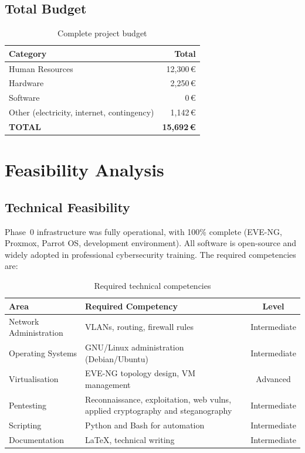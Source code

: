 \subsection{Total Budget}

\begin{table}[H]
    \centering
    \begin{tabularx}{\textwidth}{Xr}
\toprule
    \textbf{Category} & \textbf{Total} \\
\midrule
    Human Resources  & 12{,}300\,\euro \\
    Hardware         & 2{,}250\,\euro  \\
    Software         & 0\,\euro        \\
    Other (electricity, internet, contingency) & 1{,}142\,\euro \\
    \textbf{TOTAL}   & \textbf{15{,}692\,\euro} \\
\bottomrule
    \end{tabularx}
    \caption{Complete project budget}
    \label{tab:total_budget}
\end{table}



\section{Feasibility Analysis}

\subsection{Technical Feasibility}

Phase~0 infrastructure was fully operational, with 100\% complete (EVE-NG, Proxmox\cite{proxmox}, Parrot OS\cite{parrot_os},
development environment). All software is open-source and widely adopted in professional
cybersecurity training. The required competencies are:

\newpage

\begin{table}[H]
    \centering
    \begin{tabularx}{\textwidth}{XXc}
\toprule
    \textbf{Area} & \textbf{Required Competency} & \textbf{Level} \\
\midrule
    Network Administration & VLANs, routing, firewall rules & Intermediate \\
    Operating Systems      & GNU/Linux administration (Debian/Ubuntu) & Intermediate \\
    Virtualisation         & EVE-NG topology design, VM management & Advanced \\
    Pentesting             & Reconnaissance, exploitation, web vulns, applied cryptography and steganography & Intermediate \\
    Scripting              & Python and Bash for automation & Intermediate \\
    Documentation          & LaTeX, technical writing & Intermediate \\
\bottomrule
    \end{tabularx}
    \caption{Required technical competencies}
    \label{tab:technical_competencies}
\end{table}

